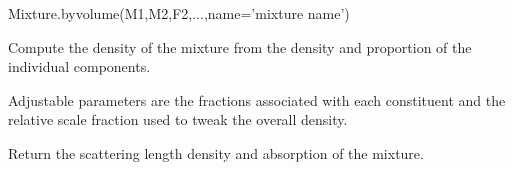 \documentclass[letterpaper,10pt,english]{sphinxmanual}
\begin{document}
\begin{fulllineitems}
\begin{fulllineitems}
Mixture.byvolume(M1,M2,F2,...,name='mixture name')

\end{fulllineitems}


\begin{fulllineitems}
\label{api/material:refl1d.material.Mixture.density}
Compute the density of the mixture from the density and proportion
of the individual components.

\end{fulllineitems}


\begin{fulllineitems}
\label{api/material:refl1d.material.Mixture.parameters}
Adjustable parameters are the fractions associated with each
constituent and the relative scale fraction used to tweak
the overall density.

\end{fulllineitems}


\begin{fulllineitems}
\label{api/material:refl1d.material.Mixture.sld}
Return the scattering length density and absorption of the mixture.

\end{fulllineitems}


\end{fulllineitems}

\end{document}
